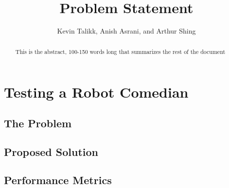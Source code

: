 \documentclass[journal, letterpaper, draftclsnofoot, onecolumn, 10pt]{IEEEtran}
\begin{document}
\title{Problem Statement}
\author{Kevin Talikk, Anish Asrani, and Arthur Shing}

\begin{titlepage}
    \centering
    \maketitle
    \begin{abstract}
      This is the abstract, 100-150 words long that summarizes the rest of the document
    \end{abstract}


\end{titlepage}

\section{Testing a Robot Comedian}

\subsection{The Problem}



\subsection{Proposed Solution}


\subsection{Performance Metrics}



\FloatBarrier
\end{document}
